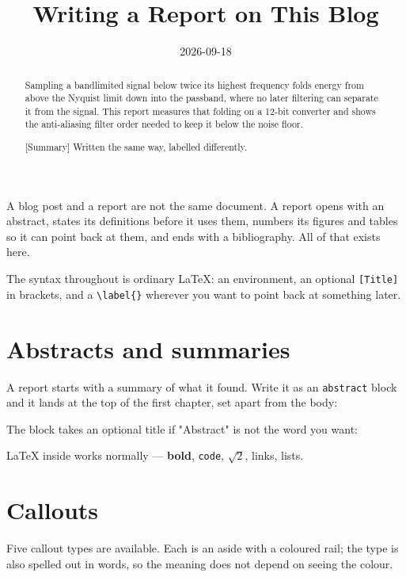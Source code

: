 \title{Writing a Report on This Blog}
\date{2026-09-18}



A blog post and a report are not the same document. A report opens with an abstract, states its definitions before it uses them, numbers its figures and tables so it can point back at them, and ends with a bibliography. All of that exists here.

The syntax throughout is ordinary LaTeX: an environment, an optional \texttt{[Title]} in brackets, and a \texttt{\textbackslash{}label\{\}} wherever you want to point back at something later.

\section{Abstracts and summaries}

A report starts with a summary of what it found. Write it as an \texttt{abstract} block and it lands at the top of the first chapter, set apart from the body:

\begin{abstract}
Sampling a bandlimited signal below twice its highest frequency folds energy from above the Nyquist limit down into the passband, where no later filtering can separate it from the signal. This report measures that folding on a 12-bit converter and shows the anti-aliasing filter order needed to keep it below the noise floor.
\end{abstract}

The block takes an optional title if "Abstract" is not the word you want:

\begin{abstract}[Summary]
Written the same way, labelled differently.
\end{abstract}

LaTeX inside works normally — \textbf{bold}, \texttt{code}, $\sqrt{2}$, links, lists.

\section{Callouts}

Five callout types are available. Each is an aside with a coloured rail; the type is also spelled out in words, so the meaning does not depend on seeing the colour.

